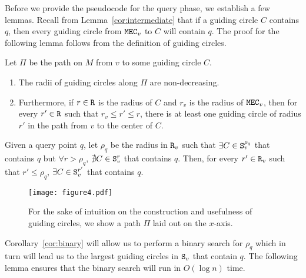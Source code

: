\documentclass[12pt]{llncs}
\begin{document}
Before we provide the pseudocode for the query phase, we establish a few lemmas. 
Recall from Lemma\ \ref{cor:intermediate} that if a guiding circle $C$ contains $q$, 
then every guiding circle from ${\tt MEC}_v$ to $C$ will contain $q$. The proof for the 
following lemma follows from the definition of guiding circles.
\begin{lemma}\label{increasing} 
Let $\Pi$ be the path on $M$ from $v$ to some guiding circle $C$. 
\begin{enumerate}
\item The radii of guiding circles along $\Pi$ are non-decreasing. 
\item Furthermore, if $r \in {\tt R}$ is the radius of $C$ and $r_v$ is the 
radius of ${\tt MEC}_v$,  then for every  $r' \in {\tt R}$ such that $r_v \le r' \le 
r$, there is at least one guiding circle of radius $r'$ in the path from $v$ to the center 
of $C$. 
\end{enumerate}
\end{lemma}
\begin{corollary}\label{cor:binary}
Given a query point $q$, let  $\rho_q$ be the radius  in ${\tt R}_v$ such that $\exists 
C \in {\tt S}_v^{\rho_q}$ that contains $q$ but $\forall  r > \rho_q$, $ \nexists C \in {\tt 
S}_v^{r}$ that contains $q$. Then, for every $r' \in {\tt R}_v$ such that $r' \le \rho_q$, 
$\exists C \in {\tt S}_v^{r'}$ that contains $q$.
\end{corollary}

\begin{figure}
\centering
\texttt{[image: figure4.pdf]}
\caption{For the sake of intuition on the construction and usefulness of guiding circles, 
we show a path $\Pi$ laid out on the $x$-axis. }
\label{fig:gc}
\end{figure}


Corollary\ \ref{cor:binary} will allow us to perform a binary search  for $\rho_q$ which 
in turn will lead us to the largest guiding circles in ${\tt S}_v$ that contain $q$. The following lemma ensures that  the binary search will run in $O(\log 
n)$ time.
\end{document}
